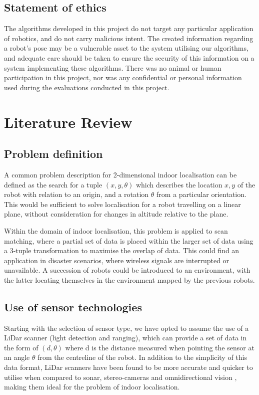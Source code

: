 \documentclass[authoryearcitations]{UoYCSproject}
\begin{document}
\section{Statement of ethics}
The algorithms developed in this project do not target any particular application of robotics, and do not carry malicious intent. The created information regarding a robot's pose may be a vulnerable asset to the system utilising our algorithms, and adequate care should be taken to ensure the security of this information on a system implementing these algorithms. There was no animal or human participation in this project, nor was any confidential or personal information used during the evaluations conducted in this project.

\chapter{Literature Review}
\label{cha:lit_review}

\section{Problem definition}
A common problem description for 2-dimensional indoor localisation can be defined as the search for a tuple $(x, y, \theta)$ which describes the location $x, y$ of the robot with relation to an origin, and a rotation $\theta$ from a particular orientation. This would be sufficient to solve localisation for a robot travelling on a linear plane, without consideration for changes in altitude relative to the plane.

Within the domain of indoor localisation, this problem is applied to scan matching, where a partial set of data is placed within the larger set of data using a 3-tuple transformation to maximise the overlap of data. This could find an application in disaster scenarios, where wireless signals are interrupted or unavailable. A succession of robots could be introduced to an environment, with the latter locating themselves in the environment mapped by the previous robots.

\section{Use of sensor technologies}
Starting with the selection of sensor type, we have opted to assume the use of a LiDar scanner (light detection and ranging), which can provide a set of data in the form of $(d, \theta)$ where d is the distance measured when pointing the sensor at an angle $\theta$ from the centreline of the robot. In addition to the simplicity of this data format, LiDar scanners have been found to be more accurate and quicker to utilise when compared to sonar, stereo-cameras and omnidirectional vision \cite{Lingemann2005-hm}, making them ideal for the problem of indoor localisation. 
\end{document}
